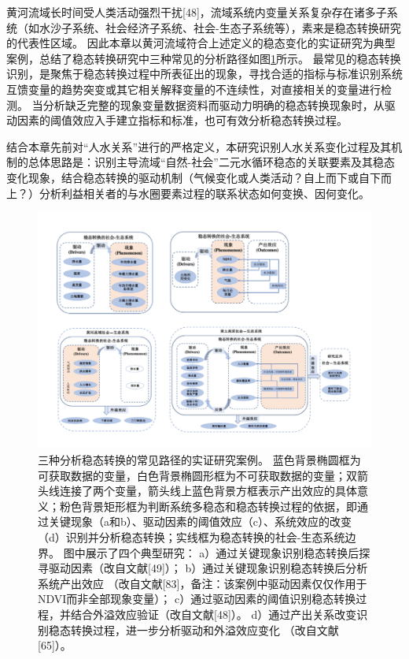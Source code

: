 黄河流域长时间受人类活动强烈干扰[48]，流域系统内变量关系复杂存在诸多子系统（如水沙子系统、社会经济子系统、社会-生态子系统等），素来是稳态转换研究的代表性区域。
因此本章以黄河流域符合上述定义的稳态变化的实证研究为典型案例，总结了稳态转换研究中三种常见的分析路径如图\ref{ch2:fig:identifying}所示。
最常见的稳态转换识别，是聚焦于稳态转换过程中所表征出的现象，寻找合适的指标与标准识别系统互馈变量的趋势突变或其它相关解释变量的不连续性，对直接相关的变量进行检测。
当分析缺乏完整的现象变量数据资料而驱动力明确的稳态转换现象时，从驱动因素的阈值效应入手建立指标和标准，也可有效分析稳态转换过程。

结合本章先前对“人水关系”进行的严格定义，本研究识别人水关系变化过程及其机制的总体思路是：识别主导流域“自然-社会”二元水循环稳态的关联要素及其稳态变化现象，结合稳态转换的驱动机制（气候变化或人类活动？自上而下或自下而上？）分析利益相关者的与水圈要素过程的联系状态如何变换、因何变化。

\begin{figure}[!htb] %
    \includegraphics[width=\textwidth]{img/ch2/ch2_identifying.png}
    \caption[三种分析稳态转换的常见路径的实证研究案例]{三种分析稳态转换的常见路径的实证研究案例。
    蓝色背景椭圆框为可获取数据的变量，白色背景椭圆形框为不可获取数据的变量；双箭头线连接了两个变量，箭头线上蓝色背景方框表示产出效应的具体意义；粉色背景矩形框为判断系统多稳态和稳态转换过程的依据，即通过关键现象（a和b）、驱动因素的阈值效应（c）、系统效应的改变（d）识别并分析稳态转换；实线框为稳态转换的社会-生态系统边界。
    图中展示了四个典型研究：
    a）通过关键现象识别稳态转换后探寻驱动因素（改自文献[49]）；
    b）通过关键现象识别稳态转换后分析系统产出效应 （改自文献[83]，备注：该案例中驱动因素仅仅作用于NDVI而非全部现象变量）；
    c）通过驱动因素的阈值识别稳态转换过程，并结合外溢效应验证（改自文献[48]）。
    d）通过产出关系改变识别稳态转换过程，进一步分析驱动和外溢效应变化 （改自文献[65]）。}\label{ch2:fig:identifying}
\end{figure}
